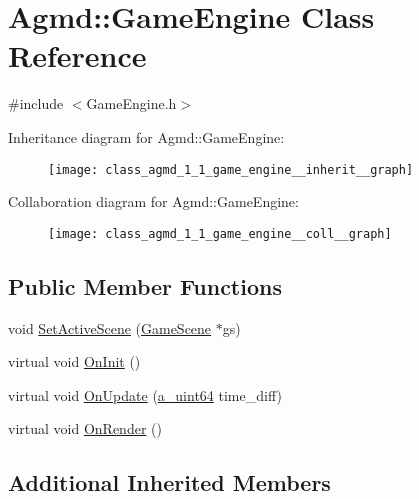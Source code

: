 \hypertarget{class_agmd_1_1_game_engine}{\section{Agmd\+:\+:Game\+Engine Class Reference}
\label{class_agmd_1_1_game_engine}
}


{\ttfamily \#include $<$Game\+Engine.\+h$>$}



Inheritance diagram for Agmd\+:\+:Game\+Engine\+:\nopagebreak
\begin{figure}[H]
\begin{center}
\leavevmode
\texttt{[image: class\_agmd\_1\_1\_game\_engine\_\_inherit\_\_graph]}
\end{center}
\end{figure}


Collaboration diagram for Agmd\+:\+:Game\+Engine\+:\nopagebreak
\begin{figure}[H]
\begin{center}
\leavevmode
\texttt{[image: class\_agmd\_1\_1\_game\_engine\_\_coll\_\_graph]}
\end{center}
\end{figure}
\subsection*{Public Member Functions}
\begin{DoxyCompactItemize}
\item 
void \hyperlink{class_agmd_1_1_game_engine_a1055bdbcb16c388f1beb4e3c2657543c}{Set\+Active\+Scene} (\hyperlink{class_agmd_1_1_game_scene}{Game\+Scene} $\ast$gs)
\item 
virtual void \hyperlink{class_agmd_1_1_game_engine_a526c6fc6be2fe3125b0c39834a1575ac}{On\+Init} ()
\item 
virtual void \hyperlink{class_agmd_1_1_game_engine_ac4c30b978ed120700ceb0561ec2ad0a7}{On\+Update} (\hyperlink{_common_defines_8h_a6c5192ec3c55d6e5b13d2dbaa082bdea}{a\+\_\+uint64} time\+\_\+diff)
\item 
virtual void \hyperlink{class_agmd_1_1_game_engine_a3f8ec61e7b21accfbdf9986d2cf1e50f}{On\+Render} ()
\end{DoxyCompactItemize}
\subsection*{Additional Inherited Members}


